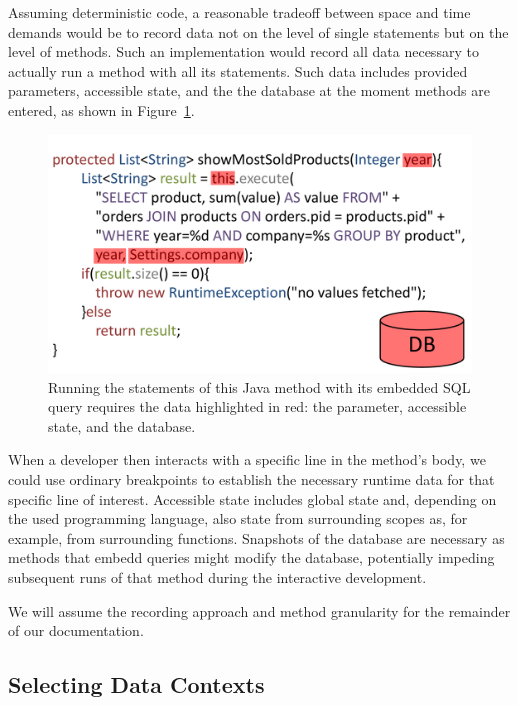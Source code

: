 Assuming deterministic code, a reasonable tradeoff between space and time demands would be to record data not on the level of single statements but on the level of methods.
Such an implementation would record all data necessary to actually run a method with all its statements.
Such data includes provided parameters, accessible state, and the the database at the moment methods are entered, as shown in Figure~\ref{fig:context_recording}.

\begin{figure}
    \includegraphics[width=\linewidth]{images/context}
    \caption{Running the statements of this Java method with its embedded SQL query requires the data highlighted in red: the parameter, accessible state, and the database.}
    \label{fig:context_recording}
\end{figure}

When a developer then interacts with a specific line in the method's body, we could use ordinary breakpoints to establish the necessary runtime data for that specific line of interest. 
Accessible state includes global state and, depending on the used programming language, also state from surrounding scopes as, for example, from surrounding functions.
Snapshots of the database are necessary as methods that embedd queries might modify the database, potentially impeding subsequent runs of that method during the interactive development.

We will assume the recording approach and method granularity for the remainder of our documentation.

\subsection{Selecting Data Contexts}

